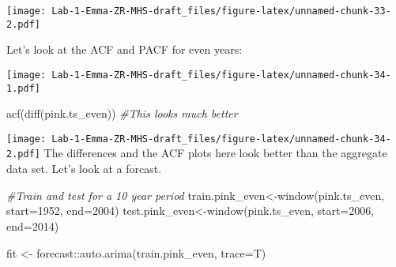 \documentclass[
]{article}
\newenvironment{Shaded}{\begin{snugshade}}{\end{snugshade}}
\newcommand{\AttributeTok}[1]{\textcolor[rgb]{0.77,0.63,0.00}{#1}}
\newcommand{\CommentTok}[1]{\textcolor[rgb]{0.56,0.35,0.01}{\textit{#1}}}
\newcommand{\DecValTok}[1]{\textcolor[rgb]{0.00,0.00,0.81}{#1}}
\newcommand{\FloatTok}[1]{\textcolor[rgb]{0.00,0.00,0.81}{#1}}
\newcommand{\FunctionTok}[1]{\textcolor[rgb]{0.00,0.00,0.00}{#1}}
\newcommand{\NormalTok}[1]{#1}
\newcommand{\OtherTok}[1]{\textcolor[rgb]{0.56,0.35,0.01}{#1}}
\newcommand{\SpecialCharTok}[1]{\textcolor[rgb]{0.00,0.00,0.00}{#1}}
\begin{document}
\texttt{[image: Lab-1-Emma-ZR-MHS-draft\_files/figure-latex/unnamed-chunk-33-2.pdf]}

Let's look at the ACF and PACF for even years:

\begin{Shaded}
\end{Shaded}

\texttt{[image: Lab-1-Emma-ZR-MHS-draft\_files/figure-latex/unnamed-chunk-34-1.pdf]}

\begin{Shaded}
\begin{Highlighting}[]
\FunctionTok{acf}\NormalTok{(}\FunctionTok{diff}\NormalTok{(pink.ts\_even)) }\CommentTok{\#This looks much better}
\end{Highlighting}
\end{Shaded}

\texttt{[image: Lab-1-Emma-ZR-MHS-draft\_files/figure-latex/unnamed-chunk-34-2.pdf]}
The differences and the ACF plots here look better than the aggregate
data set. Let's look at a forcast.

\begin{Shaded}
\begin{Highlighting}[]
\CommentTok{\#Train and test for a 10 year period}
\NormalTok{train.pink\_even}\OtherTok{\textless{}{-}}\FunctionTok{window}\NormalTok{(pink.ts\_even, }\AttributeTok{start=}\DecValTok{1952}\NormalTok{, }\AttributeTok{end=}\DecValTok{2004}\NormalTok{)}
\NormalTok{test.pink\_even}\OtherTok{\textless{}{-}}\FunctionTok{window}\NormalTok{(pink.ts\_even, }\AttributeTok{start=}\DecValTok{2006}\NormalTok{, }\AttributeTok{end=}\DecValTok{2014}\NormalTok{)}

\NormalTok{fit }\OtherTok{\textless{}{-}}\NormalTok{ forecast}\SpecialCharTok{::}\FunctionTok{auto.arima}\NormalTok{(train.pink\_even, }\AttributeTok{trace=}\NormalTok{T)}
\end{Highlighting}
\end{Shaded}
\end{document}
